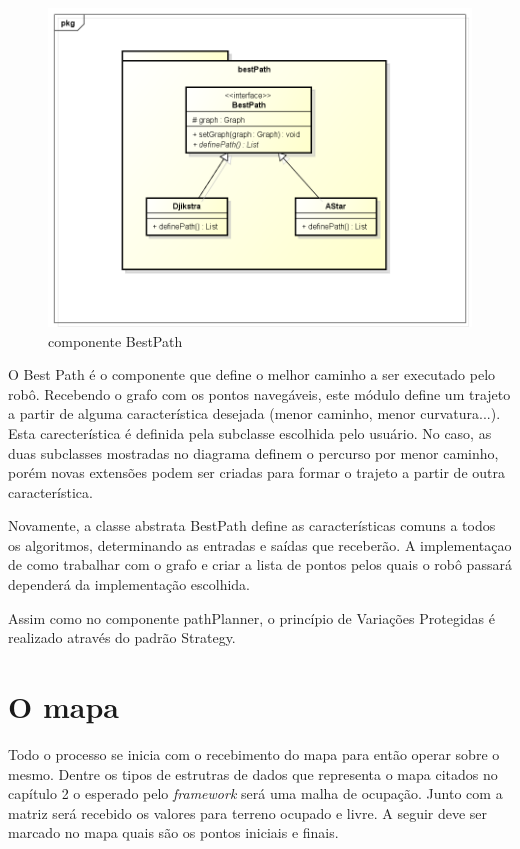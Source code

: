 \begin{figure}[h]
	\centering
	\label{fig27}
		\includegraphics[keepaspectratio=true,scale=0.5]{figuras/pkgbestPath.png}
	\caption{componente BestPath}
\end{figure}

O Best Path é o componente que define o melhor caminho a ser executado pelo robô. Recebendo o grafo com os pontos navegáveis, este módulo define um trajeto a partir de alguma característica desejada (menor caminho, menor curvatura...). Esta carecterística é definida pela subclasse escolhida pelo usuário. No caso, as duas subclasses mostradas no diagrama definem o percurso por menor caminho, porém novas extensões podem ser criadas para formar o trajeto a partir de outra característica.

Novamente, a classe abstrata BestPath define as características comuns a todos os algoritmos, determinando as entradas e saídas que receberão. A implementaçao de como trabalhar com o grafo e criar a lista de pontos pelos quais o robô passará dependerá da implementação escolhida.

Assim como no componente pathPlanner, o princípio de Variações Protegidas é realizado através do padrão Strategy.

\section{O mapa}

Todo o processo se inicia com o recebimento do mapa para então operar sobre o mesmo. Dentre os tipos de estrutras de dados que representa o mapa citados no capítulo 2 o esperado pelo \textit{framework} será uma malha de ocupação. Junto com a matriz será recebido os valores para terreno ocupado e livre. A seguir deve ser marcado no mapa quais são os pontos iniciais e finais.

